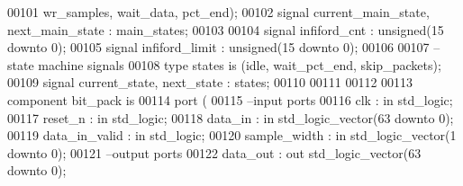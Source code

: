\begin{DoxyCode}
00101                        \textcolor{vhdlchar}{wr\_samples}\textcolor{vhdlchar}{,} \textcolor{vhdlchar}{wait\_data}\textcolor{vhdlchar}{,} \textcolor{vhdlchar}{pct\_end}\textcolor{vhdlchar}{)};
00102 \textcolor{keywordflow}{signal} \textcolor{vhdlchar}{current_main_state}\textcolor{vhdlchar}{,} \textcolor{vhdlchar}{next_main_state} \textcolor{vhdlchar}{:}   \textcolor{vhdlchar}{main_states};
00103 
00104 \textcolor{keywordflow}{signal} \textcolor{vhdlchar}{infiford_cnt}     \textcolor{vhdlchar}{:} \textcolor{comment}{unsigned}\textcolor{vhdlchar}{(}\textcolor{vhdllogic}{}\textcolor{vhdllogic}{15} \textcolor{keywordflow}{downto} \textcolor{vhdllogic}{}\textcolor{vhdllogic}{0}\textcolor{vhdlchar}{)};
00105 \textcolor{keywordflow}{signal} \textcolor{vhdlchar}{infiford_limit}   \textcolor{vhdlchar}{:} \textcolor{comment}{unsigned}\textcolor{vhdlchar}{(}\textcolor{vhdllogic}{}\textcolor{vhdllogic}{15} \textcolor{keywordflow}{downto} \textcolor{vhdllogic}{}\textcolor{vhdllogic}{0}\textcolor{vhdlchar}{)};
00106 
00107 \textcolor{keyword}{--state machine signals}
00108 \textcolor{keywordflow}{type} \textcolor{vhdlchar}{states}   \textcolor{keywordflow}{is} \textcolor{vhdlchar}{(}\textcolor{vhdlchar}{idle}\textcolor{vhdlchar}{,} \textcolor{vhdlchar}{wait\_pct\_end}\textcolor{vhdlchar}{,} \textcolor{vhdlchar}{skip\_packets}\textcolor{vhdlchar}{)};
00109 \textcolor{keywordflow}{signal} \textcolor{vhdlchar}{current_state}\textcolor{vhdlchar}{,} \textcolor{vhdlchar}{next_state} \textcolor{vhdlchar}{:}   \textcolor{vhdlchar}{states};
00110 
00111 
00112 
00113 \textcolor{keywordflow}{component} bit_pack \textcolor{keywordflow}{is}
00114   \textcolor{keywordflow}{port} (
00115 \textcolor{keyword}{        --input ports }
00116         clk             : \textcolor{keywordflow}{in} \textcolor{comment}{std\_logic};
00117         reset_n         : \textcolor{keywordflow}{in} \textcolor{comment}{std\_logic};
00118         data_in         : \textcolor{keywordflow}{in} \textcolor{comment}{std\_logic\_vector}(\textcolor{vhdllogic}{}\textcolor{vhdllogic}{63} \textcolor{keywordflow}{downto} \textcolor{vhdllogic}{}\textcolor{vhdllogic}{0});
00119         data_in_valid   : \textcolor{keywordflow}{in} \textcolor{comment}{std\_logic};
00120         sample_width    : \textcolor{keywordflow}{in} \textcolor{comment}{std\_logic\_vector}(\textcolor{vhdllogic}{}\textcolor{vhdllogic}{1} \textcolor{keywordflow}{downto} \textcolor{vhdllogic}{}\textcolor{vhdllogic}{0});
00121 \textcolor{keyword}{        --output ports }
00122         data_out        : \textcolor{keywordflow}{out} \textcolor{comment}{std\_logic\_vector}(\textcolor{vhdllogic}{}\textcolor{vhdllogic}{63} \textcolor{keywordflow}{downto} \textcolor{vhdllogic}{}\textcolor{vhdllogic}{0});

\end{DoxyCode}
